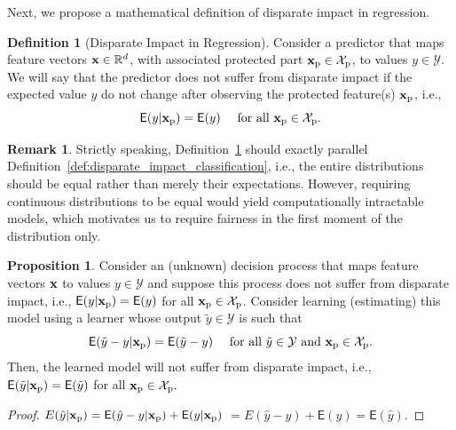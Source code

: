 \documentclass[letterpaper]{article} %
\theoremstyle{definition}
\newtheorem{definition}{Definition}[section]
\newtheorem{remark}{Remark}[section]
\newtheorem{proposition}{Proposition}[section]
\newcommand{\1}{\ensuremath{{\rm e}}} %
\newcommand{\E}{\ensuremath{\mathsf{E}}} %
\newcommand{\prx}{{\bf x}_{\rm p}}
\newcommand{\prX}{{\mathcal X}_{\rm p}}
\begin{document}
Next, we propose a mathematical definition of disparate impact in regression.

\begin{definition}[Disparate Impact in Regression] Consider a predictor that maps feature vectors ${\bf x} \in \mathbb R^d$, with associated protected part $\prx \in \prX$, to values $y \in \mathcal Y$. We will say that the predictor does not suffer from disparate impact if the expected value $y$ do not change after observing the protected feature(s) $\prx$, i.e.,
\begin{equation}
\E( y |  \prx ) = \E( y ) \quad \text{ for all } \prx \in \prX.
\label{eq:disparate_impact_regression}
\end{equation}
\label{def:disparate_impact_regression}
\end{definition}

\begin{remark}
Strictly speaking, Definition~\ref{def:disparate_impact_regression} should exactly parallel Definition~\ref{def:disparate_impact_classification}, i.e., the entire distributions should be equal rather than merely their expectations. However, requiring continuous distributions to be equal would yield computationally intractable models, which motivates us to require fairness in the first moment of the distribution only. 
\end{remark}

\begin{proposition}
Consider an (unknown) decision process that maps feature vectors ${\bf x}$ to values $y\in \mathcal Y$ and suppose this process does not suffer from disparate impact, i.e.,
$
\E(  y |  \prx ) = \E( y )$ for all $\prx \in \prX$.
Consider learning (estimating) this model using a learner whose output $\tilde y \in \mathcal Y$ is such that \begin{equation*}
\E( \tilde y - y |  \prx ) = \E( \tilde y - y ) \quad \text{ for all } \tilde y \in \mathcal Y \text { and } \prx \in \prX.
\end{equation*}
Then, the learned model will not suffer from disparate impact, i.e., 
$
\E( \tilde y |  \prx ) = \E( \tilde y )$ for all $\prx \in \prX.
$
\end{proposition}

\begin{proof}
$E(\hat y |  \prx) = \E( \hat y-y | \prx) + \E(y|\prx)$
$=E(\hat y- y) + \E(y) = \E(\hat y).$
\end{proof}
\end{document}
